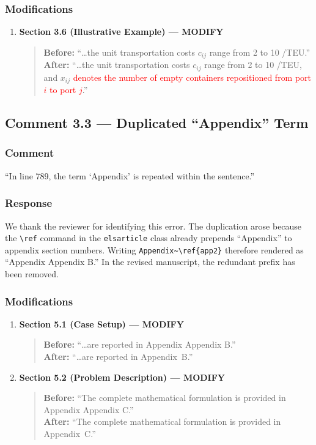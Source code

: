 \documentclass[11pt,a4paper]{article}
\begin{document}
\subsubsection{Modifications}
\begin{enumerate}
\item \textbf{Section 3.6 (Illustrative Example) --- MODIFY}
\begin{quote}
\textbf{Before:} ``\ldots the unit transportation costs $c_{ij}$ range from 2 to 10 \textyen/TEU.''\\[4pt]
\textbf{After:} ``\ldots the unit transportation costs $c_{ij}$ range from 2 to 10 \textyen/TEU, and $x_{ij}$ \textcolor{red}{denotes the number of empty containers repositioned from port $i$ to port $j$}.''
\end{quote}
\end{enumerate}

\subsection{Comment 3.3 --- Duplicated ``Appendix'' Term}

\subsubsection{Comment}
``In line 789, the term `Appendix' is repeated within the sentence.''

\subsubsection{Response}
We thank the reviewer for identifying this error. The duplication arose because the \texttt{\textbackslash ref} command in the \texttt{elsarticle} class already prepends ``Appendix'' to appendix section numbers. Writing \texttt{Appendix\~{}\textbackslash ref\{app2\}} therefore rendered as ``Appendix Appendix B.'' In the revised manuscript, the redundant prefix has been removed.

\subsubsection{Modifications}
\begin{enumerate}
\item \textbf{Section 5.1 (Case Setup) --- MODIFY}
\begin{quote}
\textbf{Before:} ``\ldots are reported in Appendix Appendix B.''\\[4pt]
\textbf{After:} ``\ldots are reported in Appendix~B.''
\end{quote}
\item \textbf{Section 5.2 (Problem Description) --- MODIFY}
\begin{quote}
\textbf{Before:} ``The complete mathematical formulation is provided in Appendix Appendix C.''\\[4pt]
\textbf{After:} ``The complete mathematical formulation is provided in Appendix~C.''
\end{quote}
\end{enumerate}
\end{document}
